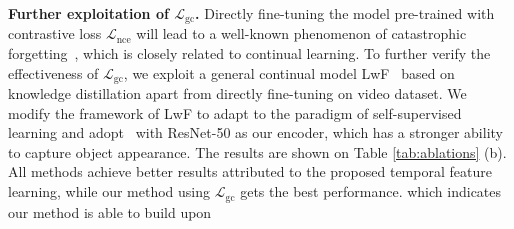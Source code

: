 \documentclass{article}
\begin{document}
 \textbf{Further exploitation of $\mathcal{L}_{\mathrm{gc}}$.}  Directly fine-tuning the model pre-trained with contrastive loss $\mathcal{L}_{\mathrm{nce}}$ will lead to a well-known phenomenon of catastrophic forgetting~\cite{li2017learning}, which is closely related to continual learning. To further verify the effectiveness of  $\mathcal{L}_{\mathrm{gc}}$, we exploit a general continual model LwF~\cite{li2017learning}  based on knowledge distillation apart from directly fine-tuning on video dataset. We modify the framework of LwF to adapt to the paradigm of self-supervised learning and adopt~\cite{xie2021detco} with ResNet-50 as our encoder, which has a stronger ability to capture object appearance. The results are shown on Table \ref{tab:ablations} (b). All methods achieve better results attributed to the proposed temporal feature learning, while our method using $\mathcal{L}_{\mathrm{gc}}$ gets the best performance. which indicates our method is able to build upon 
\end{document}
